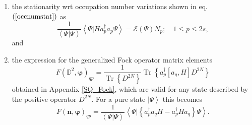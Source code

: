 \documentclass[aps,preprint]{revtex4}%
\begin{document}
\begin{enumerate}
\item the stationarity wrt occupation number variations shown in eq. $\left(
\ref{occnumstat}\right)  $ as
\begin{equation}
\frac{1}{\left\langle \left.  \Psi\right\vert \Psi\right\rangle }\left\langle
\left.  \Psi\right\vert Ha_{p}^{\dagger}a_{p}\Psi\right\rangle =\mathcal{E}%
\left(  \Psi\right)  N_{p};\quad1\leq p\leq2s,
\end{equation}
and

\item the expression for the generalized Fock operator matrix elements
\cite{L&O}
\begin{equation}
F\left(  \mathbb{D}^{2},\mathbf{\varphi}\right)  _{qp}=\frac{1}%
{\operatorname{Tr}\left\{  D^{2N}\right\}  }\operatorname{Tr}\left\{
a_{p}^{\dagger}\left[  a_{q},H\right]  D^{2N}\right\}
\end{equation}
obtained in Appendix \ref{SQ_Fock}, which are valid for any state described by
the positive operator $D^{2N}$. For a pure state $\left\vert \Psi\right\rangle
$ this becomes
\begin{equation}
F\left(  \mathbf{n},\mathbf{\varphi}\right)  _{qp}=\frac{1}{\left\langle
\left.  \Psi\right\vert \Psi\right\rangle }\left\langle \left.  \Psi
\right\vert \left\{  a_{p}^{\dagger}a_{q}H-a_{p}^{\dagger}Ha_{q}\right\}
\Psi\right\rangle .
\end{equation}

\end{enumerate}
\end{document}

